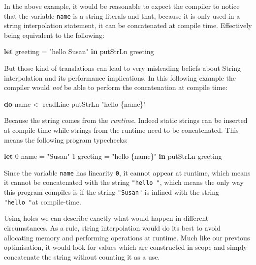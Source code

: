 \documentclass[
]{article}
\newenvironment{Shaded}{}{}
\newcommand{\DecValTok}[1]{\textcolor[rgb]{0.25,0.63,0.44}{#1}}
\newcommand{\FunctionTok}[1]{\textcolor[rgb]{0.02,0.16,0.49}{#1}}
\newcommand{\KeywordTok}[1]{\textcolor[rgb]{0.00,0.44,0.13}{\textbf{#1}}}
\newcommand{\NormalTok}[1]{#1}
\newcommand{\OtherTok}[1]{\textcolor[rgb]{0.00,0.44,0.13}{#1}}
\newcommand{\StringTok}[1]{\textcolor[rgb]{0.25,0.44,0.63}{#1}}
\begin{document}
In the above example, it would be reasonable to expect the compiler to
notice that the variable \texttt{name} is a string literals and that,
because it is only used in a string interpolation statement, it can be
concatenated at compile time. Effectively being equivalent to the
following:

\begin{Shaded}
\begin{Highlighting}[]
\KeywordTok{let}\NormalTok{ greeting }\OtherTok{=} \StringTok{"hello Susan"} \KeywordTok{in} 
    \FunctionTok{putStrLn}\NormalTok{ greeting}
\end{Highlighting}
\end{Shaded}

But those kind of translations can lead to very misleading beliefs about
String interpolation and its performance implications. In this following
example the compiler would \emph{not} be able to perform the
concatenation at compile time:

\begin{Shaded}
\begin{Highlighting}[]
\KeywordTok{do}\NormalTok{ name }\OtherTok{\textless{}{-}}\NormalTok{ readLine}
   \FunctionTok{putStrLn} \StringTok{"hello \{name\}"}
\end{Highlighting}
\end{Shaded}

Because the string comes from the \emph{runtime}. Indeed static strings
can be inserted at compile-time while strings from the runtime need to
be concatenated. This means the following program typechecks:

\begin{Shaded}
\begin{Highlighting}[]
\KeywordTok{let} \DecValTok{0}\NormalTok{ name }\OtherTok{=} \StringTok{"Susan"} 
    \DecValTok{1}\NormalTok{ greeting }\OtherTok{=} \StringTok{"hello \{name\}"} \KeywordTok{in}
    \FunctionTok{putStrLn}\NormalTok{ greeting}
\end{Highlighting}
\end{Shaded}

Since the variable \texttt{name} has linearity \texttt{0}, it cannot
appear at runtime, which means it cannot be concatenated with the string
\texttt{"hello\ "}, which means the only way this program compiles is if
the string \texttt{"Susan"} is inlined with the string
\texttt{"hello\ "}at compile-time.

Using holes we can describe exactly what would happen in different
circumstances. As a rule, string interpolation would do its best to
avoid allocating memory and performing operations at runtime. Much like
our previous optimisation, it would look for values which are
constructed in scope and simply concatenate the string without counting
it as a use.
\end{document}
